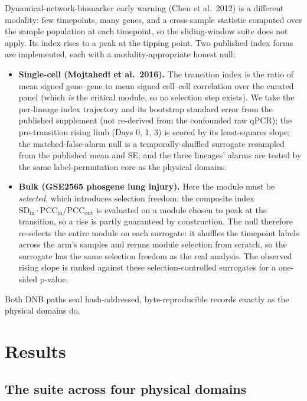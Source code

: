 \documentclass[11pt]{article}
\begin{document}
Dynamical-network-biomarker early warning (Chen et al.\ 2012) is a
different modality: few timepoints, many genes, and a cross-sample
statistic computed over the sample population at each timepoint, so the
sliding-window suite does not apply. Its index rises to a peak at the
tipping point. Two published index forms are implemented, each with a
modality-appropriate honest null:

\begin{itemize}
  \item \textbf{Single-cell (Mojtahedi et al.\ 2016).} The transition
    index is the ratio of mean signed gene--gene to mean signed
    cell--cell correlation over the curated panel (which \emph{is} the
    critical module, so no selection step exists). We take the
    per-lineage index trajectory and its bootstrap standard error from
    the published supplement (not re-derived from the confounded raw
    qPCR); the pre-transition rising limb (Days 0, 1, 3) is scored by
    its least-squares slope; the matched-false-alarm null is a
    temporally-shuffled surrogate resampled from the published mean and
    SE; and the three lineages' alarms are tested by the same
    label-permutation core as the physical domains.
  \item \textbf{Bulk (GSE2565 phosgene lung injury).} Here the module
    must be \emph{selected}, which introduces selection freedom: the
    composite index
    $\mathrm{SD_{in}} \cdot \mathrm{PCC_{in}} / \mathrm{PCC_{out}}$ is
    evaluated on a module chosen to peak at the transition, so a rise
    is partly guaranteed by construction. The null therefore re-selects
    the entire module on each surrogate: it shuffles the timepoint
    labels across the arm's samples and reruns module selection from
    scratch, so the surrogate has the same selection freedom as the
    real analysis. The observed rising slope is ranked against these
    selection-controlled surrogates for a one-sided p-value.
\end{itemize}

Both DNB paths seal hash-addressed, byte-reproducible records exactly
as the physical domains do.

\section{Results}\label{sec:results}

\subsection{The suite across four physical domains}\label{sec:fourdomain}
\end{document}
